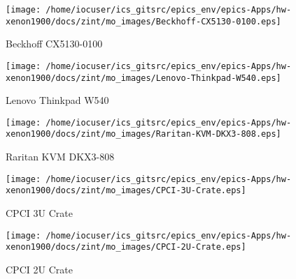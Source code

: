 \noindent
\vspace{1.4cm}
\begin{minipage}{.2\textwidth}
\begin{center}
\texttt{[image: /home/iocuser/ics\_gitsrc/epics\_env/epics-Apps/hw-xenon1900/docs/zint/mo\_images/Beckhoff-CX5130-0100.eps]}
\end{center}
\end{minipage}
\begin{minipage}{.7\textwidth}
Beckhoff CX5130-0100
\end{minipage}


\noindent
\vspace{1.4cm}
\begin{minipage}{.2\textwidth}
\begin{center}
\texttt{[image: /home/iocuser/ics\_gitsrc/epics\_env/epics-Apps/hw-xenon1900/docs/zint/mo\_images/Lenovo-Thinkpad-W540.eps]}
\end{center}
\end{minipage}
\begin{minipage}{.7\textwidth}
Lenovo Thinkpad W540
\end{minipage}


\noindent
\vspace{1.4cm}
\begin{minipage}{.2\textwidth}
\begin{center}
\texttt{[image: /home/iocuser/ics\_gitsrc/epics\_env/epics-Apps/hw-xenon1900/docs/zint/mo\_images/Raritan-KVM-DKX3-808.eps]}
\end{center}
\end{minipage}
\begin{minipage}{.7\textwidth}
Raritan KVM DKX3-808
\end{minipage}


\noindent
\vspace{1.4cm}
\begin{minipage}{.2\textwidth}
\begin{center}
\texttt{[image: /home/iocuser/ics\_gitsrc/epics\_env/epics-Apps/hw-xenon1900/docs/zint/mo\_images/CPCI-3U-Crate.eps]}
\end{center}
\end{minipage}
\begin{minipage}{.7\textwidth}
CPCI 3U Crate
\end{minipage}


\noindent
\vspace{1.4cm}
\begin{minipage}{.2\textwidth}
\begin{center}
\texttt{[image: /home/iocuser/ics\_gitsrc/epics\_env/epics-Apps/hw-xenon1900/docs/zint/mo\_images/CPCI-2U-Crate.eps]}
\end{center}
\end{minipage}
\begin{minipage}{.7\textwidth}
CPCI 2U Crate
\end{minipage}


